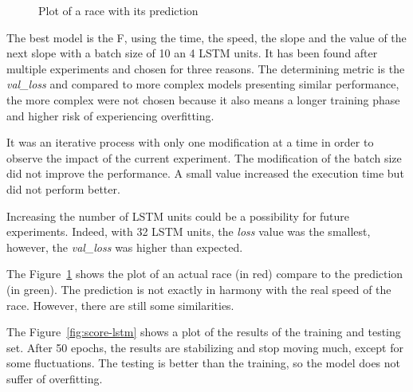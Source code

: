 \documentclass[a4paper, 10pt, conference]{ieeeconf}      %
\begin{document}
\begin{figure}[h]
  \center
  \centering
  \caption{Plot of a race with its prediction}
  \label{fig:plot-race}
\end{figure}

The best model is the F, using the time, the speed, the slope and the value of the next slope with a batch size of 10 an 4 LSTM units. It has been found after multiple experiments and chosen for three reasons. The determining metric is the \textit{val\_loss} and compared to more complex models presenting similar performance, the more complex were not chosen because it also means a longer training phase and higher risk of experiencing overfitting.

It was an iterative process with only one modification at a time in order to observe the impact of the current experiment. The modification of the batch size did not improve the performance. A small value increased the execution time but did not perform better.

Increasing the number of LSTM units could be a possibility for future experiments. Indeed, with 32 LSTM units, the \textit{loss} value was the smallest, however, the \textit{val\_loss} was higher than expected.

The Figure~\ref{fig:plot-race} shows the plot of an actual race (in red) compare to the prediction (in green). The prediction is not exactly in harmony with the real speed of the race. However, there are still some similarities.

The Figure~\ref{fig:score-lstm} shows a plot of the results of the training and testing set. After 50 epochs, the results are stabilizing and stop moving much, except for some fluctuations. The testing is better than the training, so the model does not suffer of overfitting.
\end{document}

